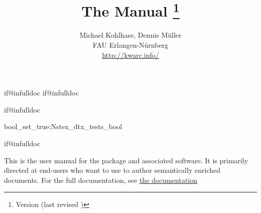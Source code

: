 \makeatletter
\ifcsname if@infulldoc\endcsname\else
    \expandafter\newif\csname if@infulldoc\endcsname\@infulldocfalse
\fi
\makeatother

\csname if@infulldoc\endcsname\else

\def\bibfolder{../lib/bib}



\infulldoctrue

\csname bool_set_true:N\expandafter\endcsname\csname stex_dtx_tests_bool\endcsname


  \csname if@infulldoc\endcsname\else
	\title{
		The {} Manual
		\thanks{Version {\fileversion} (last revised {\filedate})}
 	}
	\author{Michael Kohlhase, Dennis Müller\\
		FAU Erlangen-Nürnberg\\
		\url{http://kwarc.info/}
	}
	\maketitle
	
	\bigskip

  This is the user manual for the \sTeX package and 
  associated software. It is primarily directed at end-users 
  who want to use \sTeX to author semantically
  enriched documents. For the full documentation, see
  \href{\basedocurl/stex.pdf}{the \sTeX documentation}
	

